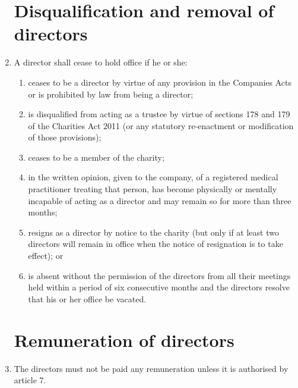 \documentclass{article}
\begin{document}
\begin{enumerate}[label=\arabic*, start=23]
    \section{Disqualification and removal of directors}
    \item A director shall cease to hold office if he or she:
    \begin{enumerate}[label=(\arabic*)]
        \item ceases to be a director by virtue of any provision in the
        Companies Acts or is prohibited by law from being a director;
        \item is disqualified from acting as a trustee by virtue of sections
        178 and 179 of the Charities Act 2011 (or any statutory
        re-enactment or modification of those provisions);
        \item ceases to be a member of the charity;
        \item in the written opinion, given to the company, of a registered
        medical practitioner treating that person, has become physically
        or mentally incapable of acting as a director and may remain so
        for more than three months;
        \item resigns as a director by notice to the charity (but only if at
        least two directors will remain in office when the notice of
        resignation is to take effect); or
        \item is absent without the permission of the directors from all their
        meetings held within a period of six consecutive months and
        the directors resolve that his or her office be vacated.
    \end{enumerate}
    
    \section{Remuneration of directors}
    \item The directors must not be paid any remuneration unless it is authorised
    by article 7.
    

\end{enumerate}
\end{document}
